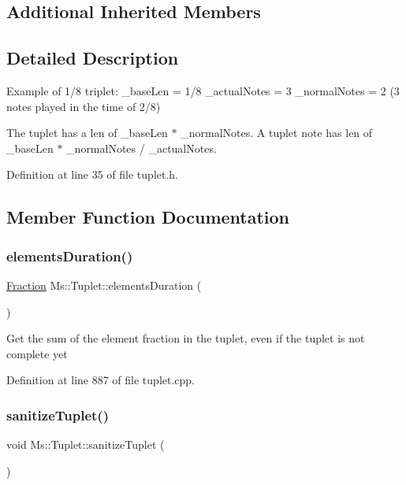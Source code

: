 \subsection*{Additional Inherited Members}


\subsection{Detailed Description}
Example of 1/8 triplet\+: \+\_\+base\+Len = 1/8 \+\_\+actual\+Notes = 3 \+\_\+normal\+Notes = 2 (3 notes played in the time of 2/8)

The tuplet has a len of \+\_\+base\+Len $\ast$ \+\_\+normal\+Notes. A tuplet note has len of \+\_\+base\+Len $\ast$ \+\_\+normal\+Notes / \+\_\+actual\+Notes. 

Definition at line 35 of file tuplet.\+h.



\subsection{Member Function Documentation}
\mbox{\label{class_ms_1_1_tuplet_a009956c2b46a1077ea5e010923a76e59}} 
\subsubsection{\texorpdfstring{elements\+Duration()}{elementsDuration()}}
{\footnotesize\ttfamily \hyperlink{class_ms_1_1_fraction}{Fraction} Ms\+::\+Tuplet\+::elements\+Duration (\begin{DoxyParamCaption}{ }\end{DoxyParamCaption})}

Get the sum of the element fraction in the tuplet, even if the tuplet is not complete yet 

Definition at line 887 of file tuplet.\+cpp.

\mbox{\label{class_ms_1_1_tuplet_a8f4710eeec93bae31c56098304569c01}} 
\subsubsection{\texorpdfstring{sanitize\+Tuplet()}{sanitizeTuplet()}}
{\footnotesize\ttfamily void Ms\+::\+Tuplet\+::sanitize\+Tuplet (\begin{DoxyParamCaption}{ }\end{DoxyParamCaption})}

